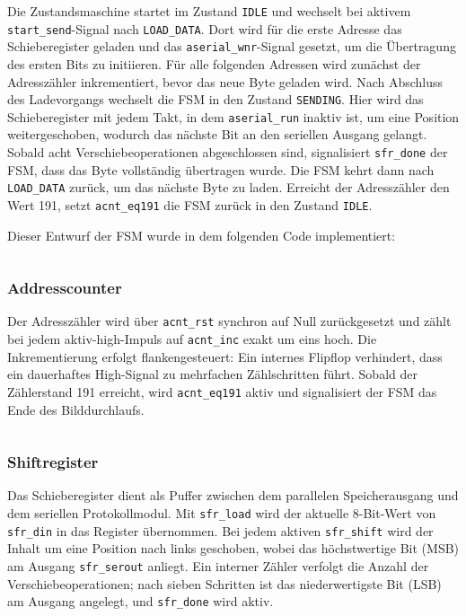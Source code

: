 Die Zustandsmaschine startet im Zustand \texttt{IDLE} und wechselt bei aktivem \texttt{start\_send}-Signal nach \texttt{LOAD\_DATA}. Dort wird für die erste Adresse das Schieberegister geladen und das \texttt{aserial\_wnr}-Signal gesetzt, um die Übertragung des ersten Bits zu initiieren. Für alle folgenden Adressen wird zunächst der Adresszähler inkrementiert, bevor das neue Byte geladen wird. Nach Abschluss des Ladevorgangs wechselt die FSM in den Zustand \texttt{SENDING}. Hier wird das Schieberegister mit jedem Takt, in dem \texttt{aserial\_run} inaktiv ist, um eine Position weitergeschoben, wodurch das nächste Bit an den seriellen Ausgang gelangt. Sobald acht Verschiebeoperationen abgeschlossen sind, signalisiert \texttt{sfr\_done} der FSM, dass das Byte vollständig übertragen wurde. Die FSM kehrt dann nach \texttt{LOAD\_DATA} zurück, um das nächste Byte zu laden. Erreicht der Adresszähler den Wert 191, setzt \texttt{acnt\_eq191} die FSM zurück in den Zustand \texttt{IDLE}.

Dieser Entwurf der FSM wurde in dem folgenden Code implementiert:

\inputminted[linenos,frame=single,fontsize=\footnotesize]{vhdl}{A8_Abgabe/rtl/fsm.vhd}

\subsubsection{Addresscounter}

Der Adresszähler wird über \texttt{acnt\_rst} synchron auf Null zurückgesetzt und zählt bei jedem aktiv-high-Impuls auf \texttt{acnt\_inc} exakt um eins hoch. Die Inkrementierung erfolgt flankengesteuert: Ein internes Flipflop verhindert, dass ein dauerhaftes High-Signal zu mehrfachen Zählschritten führt. Sobald der Zählerstand 191 erreicht, wird \texttt{acnt\_eq191} aktiv und signalisiert der FSM das Ende des Bilddurchlaufs.

\inputminted[linenos,frame=single,fontsize=\footnotesize]{vhdl}{A8_Abgabe/rtl/addresscounter.vhd}

\subsubsection{Shiftregister}

Das Schieberegister dient als Puffer zwischen dem parallelen Speicherausgang und dem seriellen Protokollmodul. Mit \texttt{sfr\_load} wird der aktuelle 8-Bit-Wert von \texttt{sfr\_din} in das Register übernommen. Bei jedem aktiven \texttt{sfr\_shift} wird der Inhalt um eine Position nach links geschoben, wobei das höchstwertige Bit (MSB) am Ausgang \texttt{sfr\_serout} anliegt. Ein interner Zähler verfolgt die Anzahl der Verschiebeoperationen; nach sieben Schritten ist das niederwertigste Bit (LSB) am Ausgang angelegt, und \texttt{sfr\_done} wird aktiv.

